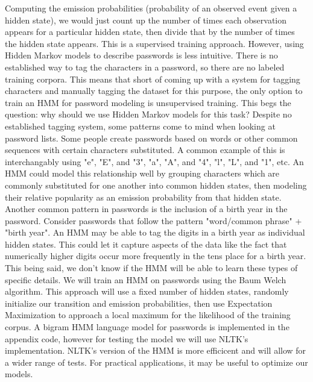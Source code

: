 \documentclass{amsart}
\theoremstyle{definition}
\theoremstyle{remark}
\numberwithin{equation}{section}
\begin{document}
Computing the emission probabilities (probability of an observed event given a hidden state), we would just count up the number of times each observation appears for a particular hidden state, then divide that by the number of times the hidden state appears. This is a supervised training approach. However, using Hidden Markov models to describe passwords is less intuitive. There is no established way to tag the characters in a password, so there are no labeled training corpora. This means that short of coming up with a system for tagging characters and manually tagging the dataset for this purpose, the only option to train an HMM for password modeling is unsupervised training. This begs the question: why should we use Hidden Markov models for this task? Despite no established tagging system, some patterns come to mind when looking at password lists. Some people create passwords based on words or other common sequences with certain characters substituted. A common example of this is interchangably using "e", "E", and "3", "a", "A", and "4", "l", "L", and "1", etc. An HMM could model this relationship well by grouping characters which are commonly substituted for one another into common hidden states, then modeling their relative popularity as an emission probability from that hidden state. Another common pattern in passwords is the inclusion of a birth year in the password. Consider passwords that follow the pattern "word/common phrase" + "birth year". An HMM may be able to tag the digits in a birth year as individual hidden states. This could let it capture aspects of the data like the fact that numerically higher digits occur more frequently in the tens place for a birth year. This being said, we don't know if the HMM will be able to learn these types of specific details. We will train an HMM on passwords using the Baum Welch algorithm. This approach will use a fixed number of hidden states, randomly initialize our transition and emission probabilities, then use Expectation Maximization to approach a local maximum for the likelihood of the training corpus. A bigram HMM language model for passwords is implemented in the appendix code, however for testing the model we will use NLTK's implementation. NLTK's version of the HMM is more efficicent and will allow for a wider range of tests. For practical applications, it may be useful to optimize our models.

\end{document}
